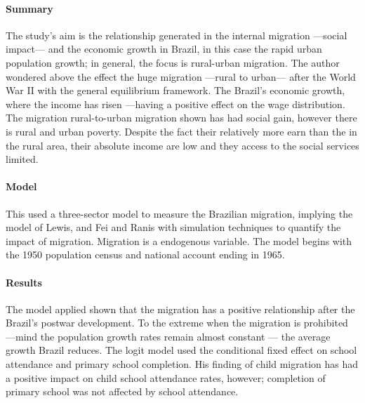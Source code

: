 \documentclass[11pt]{article}
\theoremstyle{prop}
\begin{document}
	\paragraph{Summary}The study’s aim is the relationship generated in the internal migration —social impact— and the economic growth in Brazil, in this case the rapid urban population growth; in general, the focus is rural-urban migration. The author wondered above the effect the huge migration —rural to urban— after the World War II with the general equilibrium framework. The Brazil’s economic growth, where the income has risen —having a positive effect on the wage distribution. The migration rural-to-urban migration shown has had social gain, however there is rural and urban poverty. Despite the fact their relatively more earn than the in the rural area, their absolute income are low and they access to the social services limited.
	
	\paragraph{Model} This used a three-sector model to measure the Brazilian migration, implying the model of Lewis, and Fei and Ranis with simulation techniques to quantify the impact of migration. Migration is a endogenous variable. The model begins with the 1950 population census and national account ending in 1965.
	
	\paragraph{Results} The model applied shown that the migration has a positive relationship after the Brazil’s postwar development. To the extreme when the migration is prohibited —mind the population growth rates remain almost constant — the average growth Brazil reduces. The logit model used the conditional fixed effect on school attendance and primary school completion. His finding of child migration has had a positive impact on child school attendance rates, however; completion of primary school was not affected by school attendance.
	
	 
\end{document}
